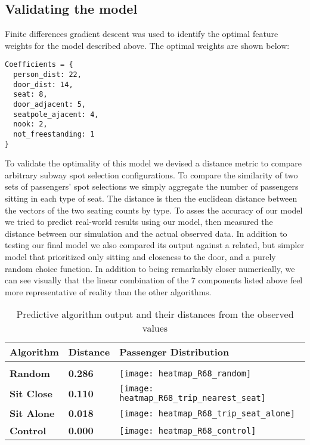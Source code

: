\documentclass{acm_proc_article-sp}
\begin{document}
\subsection{Validating the model}
  Finite differences gradient descent\cite{flaxman2005online} was used to identify the optimal feature weights for the model described above. The optimal weights are shown below:
  \begin{lstlisting}
Coefficients = {
  person_dist: 22,
  door_dist: 14,
  seat: 8,
  door_adjacent: 5,
  seatpole_ajacent: 4,
  nook: 2,
  not_freestanding: 1
}
\end{lstlisting}

To validate the optimality of this model we devised a distance metric to compare arbitrary subway spot selection configurations. To compare the similarity of two sets of passengers' spot selections we simply aggregate the number of passengers sitting in each type of seat. The distance is then the euclidean distance between the vectors of the two seating counts by type. To asses the accuracy of our model we tried to predict real-world results using our model, then measured the distance between our simulation and the actual observed data. In addition to testing our final model we also compared its output against a related, but simpler model that prioritized only sitting and closeness to the door, and a purely random choice function. In addition to being remarkably closer numerically, we can see visually that the linear combination of the 7 components listed above feel more representative of reality than the other algorithms.

\begin{table*}[t]
  \caption{Predictive algorithm output and their distances from the observed values} \label{tab:compare_algosi}
  \begin{tabular}
      {lll} \hline Algorithm & Distance & Passenger Distribution \\ \hline \\
      \textbf{Random} & \textbf{0.286} & \parbox[c]{1em}{ \texttt{[image: heatmap\_R68\_random]}} \\
      \textbf{Sit Close} & \textbf{0.110} & \parbox[c]{1em}{ \texttt{[image: heatmap\_R68\_trip\_nearest\_seat]}} \\
      \textbf{Sit Alone} & \textbf{0.018} & \parbox[c]{1em}{ \texttt{[image: heatmap\_R68\_trip\_seat\_alone]}} \\
      \textbf{Control} & \textbf{0.000} & \parbox[c]{1em}{ \texttt{[image: heatmap\_R68\_control]}} \\
 \end{tabular}
\end{table*}
\end{document}
